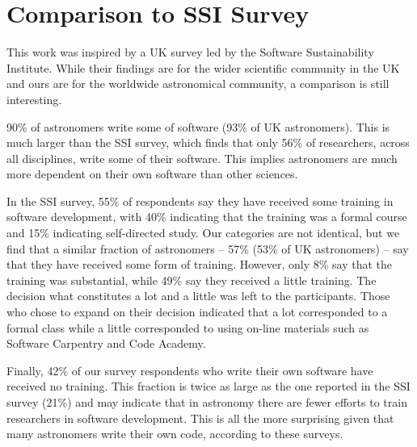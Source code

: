 \section{Comparison to SSI Survey}
\label{sec:ssicompare}

This work was inspired by a UK survey led by the Software Sustainability Institute. While their findings are for the wider scientific community in the UK and ours are for the worldwide astronomical community, a comparison is still interesting. 

90\% of astronomers write some of software (93\% of UK astronomers). This is much larger than the SSI survey, which finds that only 56\% of researchers, across all disciplines, write some of their software.  This implies astronomers are much more dependent on their own software than other sciences.

In the SSI survey, 55\% of respondents say they have received some training in software development, with 40\% indicating that the training was a formal course and 15\% indicating self-directed study. Our categories are not identical, but we find that a similar fraction of astronomers -- 57\% (53\% of UK astronomers) -- say that they have received some form of training. However, only 8\% say that the training was substantial, while 49\% say they received a little training. The decision what constitutes a lot and a little was left to the participants. Those who chose to expand on their decision indicated that a lot corresponded to a formal class while a little corresponded to using on-line materials such as Software Carpentry and Code Academy.

Finally, 42\% of our survey respondents who write their own software have received no training. This fraction is twice as large as the one reported in the SSI survey (21\%) and may indicate that in astronomy there are fewer efforts to train researchers in software development.  This is all the more surprising given that many  astronomers write their own code, according to these surveys.



    